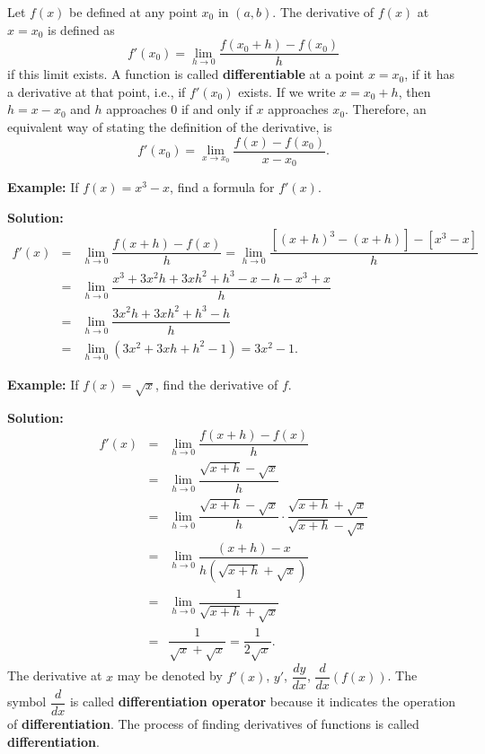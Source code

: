\documentclass[titlepage,a4paper,12pt]{report}
\begin{document}
\noindent Let $f(x)$ be defined at any point $x_0$ in $(a,b)$. The derivative of $f(x)$ at $x=x_0$ is defined as 
\begin{equation*}
f'(x_0)=\lim _{h\rightarrow 0}\dfrac{f(x_0+h)-f(x_0)}{h}
\end{equation*}
if this limit exists. A function is called \textbf{differentiable} at a point $x=x_0$, if it has a derivative at that point, i.e., if $f'(x_0)$ exists.  If we write $x=x_0+h$, then $h=x-x_0$ and $h$ approaches $0$ if and only if $x$ approaches $x_0$. Therefore, an equivalent way of stating the definition of the derivative, is 
\begin{equation*}
f'(x_0)=\lim _{x\rightarrow x_0} \dfrac{f(x)-f(x_0)}{x-x_0}.
\end{equation*}

\noindent \textbf{Example:} If $f(x)=x^3-x$, find a formula for $f'(x)$.

\noindent \textbf{Solution:} 
\begin{eqnarray*}
f'(x) &=& \lim _{h\rightarrow 0} \dfrac{f(x+h)-f(x)}{h} =\lim _{h\rightarrow 0}\dfrac{[(x+h)^3-(x+h)]-[x^3-x]}{h}\\
&=& \lim _{h\rightarrow 0} \dfrac{x^3+3x^2h+3xh^2+h^3-x-h-x^3+x}{h}\\
&=& \lim _{h\rightarrow 0} \dfrac{3x^2h+3xh^2+h^3-h}{h}\\
&=& \lim _{h\rightarrow 0} (3x^2+3xh+h^2-1) =3x^2-1.
\end{eqnarray*}

\noindent \textbf{Example:} If $f(x)=\sqrt{x}$, find the derivative of $f$.

\noindent \textbf{Solution:} 
\begin{eqnarray*}
f'(x) &=& \lim _{h\rightarrow 0} \dfrac{f(x+h)-f(x)}{h}\\
&=& \lim _{h\rightarrow 0} \dfrac{\sqrt{x+h}-\sqrt{x}}{h}\\
&=& \lim _{h\rightarrow 0} \dfrac{\sqrt{x+h}-\sqrt{x}}{h} \cdot \dfrac{\sqrt{x+h}+\sqrt{x}}{\sqrt{x+h}-\sqrt{x}}\\
&=& \lim _{h\rightarrow 0} \dfrac{(x+h)-x}{h(\sqrt{x+h}+\sqrt{x})}\\
&=& \lim _{h\rightarrow 0} \dfrac{1}{\sqrt{x+h}+\sqrt{x}}\\
&=& \dfrac{1}{\sqrt{x} +\sqrt{x}} =\dfrac{1}{2\sqrt{x}}. 
\end{eqnarray*}
\noindent The derivative at $x$ may be denoted by $f'(x)$, $y'$, $\dfrac{dy}{dx}$, $\dfrac{d}{dx}(f(x))$. The symbol $\dfrac{d}{dx}$ is called \textbf{differentiation operator} because it indicates the operation of \textbf{differentiation}. The process of finding derivatives of functions is called \textbf{differentiation}.
\end{document}
